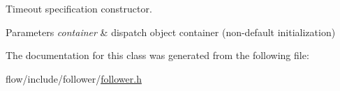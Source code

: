 Timeout specification constructor. 


\begin{DoxyParams}{Parameters}
{\em container} & dispatch object container (non-\/default initialization) \\
\hline
\end{DoxyParams}


The documentation for this class was generated from the following file\+:\begin{DoxyCompactItemize}
\item 
flow/include/follower/\hyperlink{follower_8h}{follower.\+h}\end{DoxyCompactItemize}
